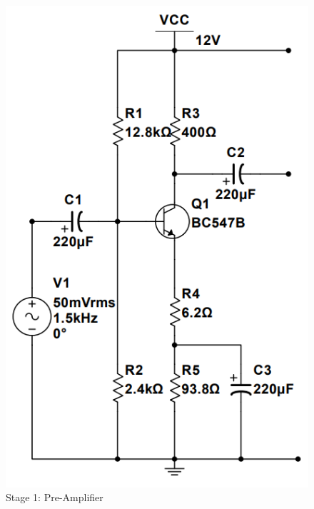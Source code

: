 \documentclass[twoside, a4paper, leqno]{article}
\begin{document}
		\begin{center}
			\begin{figure}[htp]
				\begin{center}
					\includegraphics[scale = .6]{figure/Stage1.png}
				\end{center}
				\caption{Stage 1: Pre-Amplifier}
				\label{refFigure3}
			\end{figure}
		\end{center}
		
\end{document}
